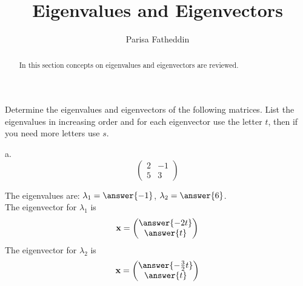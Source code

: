 \documentclass{ximera}
\author{Parisa Fatheddin}
\title{Eigenvalues and Eigenvectors}
\begin{document}
\begin{abstract}
In this section concepts on eigenvalues and eigenvectors are reviewed. 
\end{abstract}
\maketitle
\begin{center}
\end{center}
\begin{exercise}
  Determine the eigenvalues and eigenvectors of the following matrices. List the eigenvalues in increasing order and for each eigenvector use the letter $t$, then if you need more letters use $s$.

 a.  \[\begin{pmatrix}
  2& -1\\
  5 & 3
  \end{pmatrix}
  \]
  \begin{prompt}
  The eigenvalues are: $\lambda_{1}= \answer{-1}$, \hspace{.5cm} $\lambda_{2} = \answer{6}$. \\
  The eigenvector for $\lambda_{1}$ is
  \begin{equation*}
  \textbf{x} = \begin{pmatrix}
  \answer{-2t}\\
  \answer{t}
  \end{pmatrix}
  \end{equation*}
  The eigenvector for $\lambda_{2}$ is
  \begin{equation*}
  \textbf{x} = \begin{pmatrix}
  \answer{-\frac{3}{2}t}\\
  \answer{t}
  \end{pmatrix}
  \end{equation*}
\end{prompt}


\end{exercise}
\end{document}
